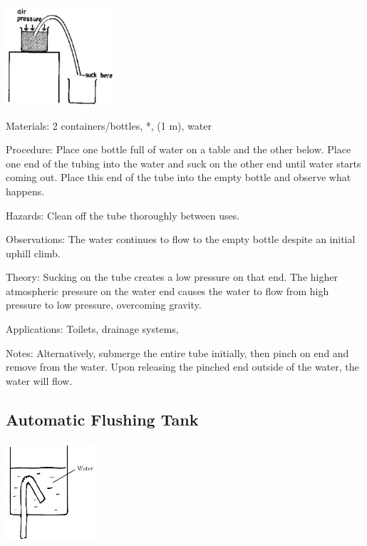 \begin{multicols}{2}
\begin{center}
\includegraphics[width=0.3\textwidth]{./img/source/siphon.png}
\end{center}

\begin{description*}
\item[Materials:]{2 containers/bottles, *, (1 m), water}
\item[Procedure:]{Place one bottle full of water on a table and the other below. Place one end of the tubing into the water and suck on the other end until water starts coming out. Place this end of the tube into the empty bottle and observe what happens.}
\item[Hazards:]{Clean off the tube thoroughly between uses.}
\item[Observations:]{The water continues to flow to the empty bottle despite an initial uphill climb.}
\item[Theory:]{Sucking on the tube creates a low pressure on that end. The higher atmospheric pressure on the water end causes the water to flow from high pressure to low pressure, overcoming gravity.}
\item[Applications:]{Toilets, drainage systems, }
\item[Notes:]{Alternatively, submerge the entire tube initially, then pinch on end and remove from the water. Upon releasing the pinched end outside of the water, the water will flow.}
\end{description*}

\subsection{Automatic Flushing Tank}
\label{sub:auto-tank}

\begin{center}
\includegraphics[width=0.25\textwidth]{./img/auto-flushing-tank.png}
\end{center}


\end{multicols}

